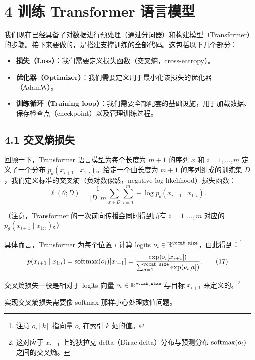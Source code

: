 \section*{4 训练 Transformer 语言模型}

我们现在已经具备了对数据进行预处理（通过分词器）和构建模型（Transformer）的步骤。接下来要做的，是搭建支撑训练的全部代码。这包括以下几个部分：
\begin{itemize}
  \item \textbf{损失（Loss）}：我们需要定义损失函数（交叉熵，cross-entropy）。
  \item \textbf{优化器（Optimizer）}：我们需要定义用于最小化该损失的优化器（AdamW）。
  \item \textbf{训练循环（Training loop）}：我们需要全部配套的基础设施，用于加载数据、保存检查点（checkpoint）以及管理训练过程。
\end{itemize}

\subsection*{4.1 交叉熵损失}

回顾一下，Transformer 语言模型为每个长度为 $m+1$ 的序列 $x$ 和 $i = 1, \dots, m$ 定义了一个分布 $p_\theta(x_{i+1} \mid x_{1:i})$。给定一个由长度为 $m+1$ 的序列组成的训练集 $D$，我们定义标准的交叉熵（负对数似然，negative log-likelihood）损失函数：
\begin{equation*}
\ell(\theta; D) = \frac{1}{|D|\,m} \sum_{x \in D} \sum_{i=1}^{m} -\log p_\theta(x_{i+1} \mid x_{1:i}). \tag{16}
\end{equation*}

（注意，Transformer 的一次前向传播会同时得到所有 $i = 1, \dots, m$ 对应的 $p_\theta(x_{i+1} \mid x_{1:i})$。）

具体而言，Transformer 为每个位置 $i$ 计算 logits $o_i \in \mathbb{R}^{\texttt{vocab\_size}}$，由此得到：\footnote{注意 $o_i[k]$ 指向量 $o_i$ 在索引 $k$ 处的值。}
\begin{equation*}
p(x_{i+1} \mid x_{1:i}) = \operatorname{softmax}(o_i)[x_{i+1}] = \frac{\exp(o_i[x_{i+1}])}{\sum_{a=1}^{\texttt{vocab\_size}} \exp(o_i[a])}. \tag{17}
\end{equation*}

交叉熵损失一般是相对于 logits 向量 $o_i \in \mathbb{R}^{\texttt{vocab\_size}}$ 与目标 $x_{i+1}$ 来定义的。\footnote{这对应于 $x_{i+1}$ 上的狄拉克 delta（Dirac delta）分布与预测分布 $\operatorname{softmax}(o_i)$ 之间的交叉熵。}

实现交叉熵损失需要像 softmax 那样小心处理数值问题。

